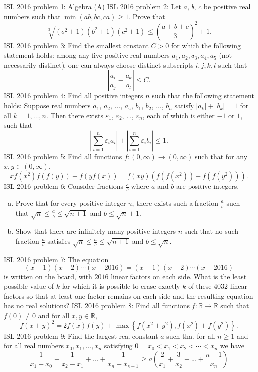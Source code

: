 ISL 2016 problem 1:  Algebra (A) 
ISL 2016 problem 2:  Let $a$, $b$, $c$ be positive real numbers such that $\min(ab,bc,ca) \ge 1$. Prove that
\[ \sqrt[3]{(a^2+1)(b^2+1)(c^2+1)} \le \left(\frac{a+b+c}{3}\right)^2 + 1. \] 
ISL 2016 problem 3:  Find the smallest constant $C > 0$ for which the following statement holds: among any five positive real numbers $a_1,a_2,a_3,a_4,a_5$ (not necessarily distinct), one can always choose distinct subscripts $i,j,k,l$ such that
\[ \left| \frac{a_i}{a_j} - \frac {a_k}{a_l} \right| \le C. \] 
ISL 2016 problem 4:  Find all positive integers $n$ such that the following statement holds: Suppose real numbers $a_1$, $a_2$, $\dots$, $a_n$, $b_1$, $b_2$, $\dots$, $b_n$ satisfy $|a_k|+|b_k|=1$ for all $k=1,\dots,n$. Then there exists $\varepsilon_1$, $\varepsilon_2$, $\dots$, $\varepsilon_n$, each of which is either $-1$ or $1$, such that
\[
\left| \sum_{i=1}^n \varepsilon_i a_i \right| + \left| \sum_{i=1}^n \varepsilon_i b_i \right| \le 1.
\] 
ISL 2016 problem 5:  Find all functions $f:(0,\infty)\rightarrow (0,\infty)$ such that for any $x,y\in (0,\infty)$,
\[ xf(x^2)f(f(y)) + f(yf(x)) = f(xy) \left(f(f(x^2)) + f(f(y^2))\right). \] 
ISL 2016 problem 6:  Consider fractions $\frac{a}{b}$ where $a$ and $b$ are positive integers.
\begin{enumerate}[(a)]
  \item Prove that for every positive integer $n$, there exists such a fraction $\frac{a}{b}$ such that $\sqrt{n} \le \frac{a}{b} \le \sqrt{n+1}$ and $b \le \sqrt{n}+1$.
  \item Show that there are infinitely many positive integers $n$ such that no such fraction $\frac{a}{b}$ satisfies $\sqrt{n} \le \frac{a}{b} \le \sqrt{n+1}$ and $b \le \sqrt{n}$.
\end{enumerate} 
ISL 2016 problem 7:  The equation
\[ (x-1)(x-2)\cdots(x-2016)=(x-1)(x-2)\cdots (x-2016) \]
is written on the board, with $2016$ linear factors on each side. What is the least possible value of $k$ for which it is possible to erase exactly $k$ of these $4032$ linear factors so that at least one factor remains on each side and the resulting equation has no real solutions? 
ISL 2016 problem 8:  Find all functions $f:\mathbb{R}\rightarrow\mathbb{R}$ such that $f(0)\neq 0$ and for all $x,y\in\mathbb{R}$,
\[ f(x+y)^2 = 2f(x)f(y) + \max \left\{ f(x^2+y^2), f(x^2)+f(y^2) \right\}. \] 
ISL 2016 problem 9:  Find the largest real constant $a$ such that for all $n \geq 1$ and for all real numbers $x_0, x_1, ... , x_n$ satisfying $0 = x_0 < x_1 < x_2 < \cdots < x_n$ we have
\[
\frac{1}{x_1-x_0} + \frac{1}{x_2-x_1} + \dots + \frac{1}{x_n-x_{n-1}} \geq a \left( \frac{2}{x_1} + \frac{3}{x_2} + \dots + \frac{n+1}{x_n} \right)
\] 
